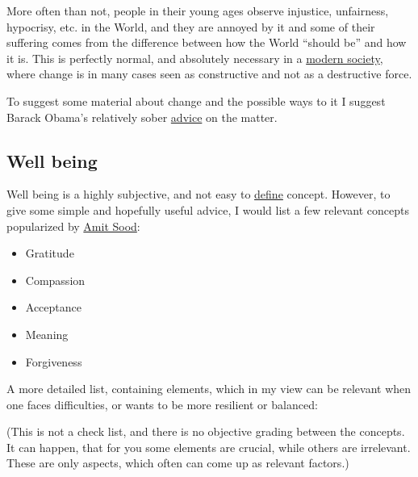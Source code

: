 \documentclass{article}
\begin{document}
More often than not, people in their young ages observe injustice, unfairness, hypocrisy, etc. in the World, and they are annoyed by it and some of their suffering comes from the difference between how the World ``should be'' and how it is. This is perfectly normal, and absolutely necessary in a \href{https://en.wikipedia.org/wiki/Modernity}{modern society}, where change is in many cases seen as constructive and not as a destructive force. 

To suggest some material about change and the possible ways to it I suggest Barack Obama's relatively sober \href{https://www.youtube.com/watch?v=Ioz96L5xASk}{advice} on the matter.


\subsection{Well being}

Well being is a highly subjective, and not easy to \href{https://plato.stanford.edu/entries/well-being/}{define} concept.
However, to give some simple and hopefully useful advice, I would list a few relevant concepts popularized by \href{https://en.wikipedia.org/wiki/Amit_Sood}{Amit Sood}:

\begin{itemize}
    \item Gratitude
    \item Compassion
    \item Acceptance
    \item Meaning
    \item Forgiveness
\end{itemize}

A more detailed list, containing elements, which in my view can be relevant when one faces difficulties, or wants to be more resilient or balanced:

(This is not a check list, and there is no objective grading between the concepts. It can happen, that for you some elements are crucial, while others are irrelevant. These are only aspects, which often can come up as relevant factors.)
\end{document}
